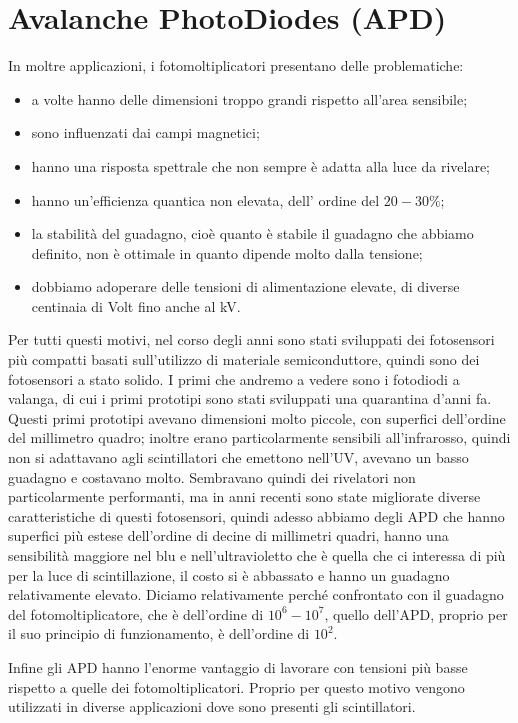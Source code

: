 \section{Avalanche PhotoDiodes (APD)}
In moltre applicazioni, i fotomoltiplicatori presentano delle problematiche:
\begin{itemize}
   \item a volte hanno delle dimensioni troppo grandi rispetto all'area sensibile;
   \item sono influenzati dai campi magnetici;
   \item hanno una risposta spettrale che non sempre è adatta alla luce da rivelare;
   \item hanno un'efficienza quantica non elevata, dell' ordine del $20-30\%$;
   \item la stabilità del guadagno, cioè quanto è stabile il guadagno che abbiamo definito, non è ottimale in quanto dipende molto dalla tensione;
   \item dobbiamo adoperare delle tensioni di alimentazione elevate, di diverse centinaia di Volt fino anche al kV.
\end{itemize}
Per tutti questi motivi, nel corso degli anni sono stati sviluppati dei fotosensori più compatti basati sull'utilizzo di materiale semiconduttore, quindi sono dei fotosensori a stato solido. I primi che andremo a vedere sono i fotodiodi a valanga, di cui i primi prototipi sono stati sviluppati una quarantina d'anni fa. Questi primi prototipi avevano dimensioni molto piccole, con superfici dell'ordine del millimetro quadro; inoltre erano particolarmente sensibili all'infrarosso, quindi non si adattavano agli scintillatori che emettono nell'UV, avevano un basso guadagno e costavano molto. Sembravano quindi dei rivelatori non particolarmente performanti, ma in anni recenti sono state migliorate diverse caratteristiche di questi fotosensori, quindi adesso abbiamo degli APD che hanno superfici più estese dell'ordine di decine di millimetri quadri, hanno una sensibilità maggiore nel blu e nell'ultravioletto che è quella che ci interessa di più per la luce di scintillazione, il costo si è abbassato e hanno un guadagno relativamente elevato. Diciamo relativamente perché confrontato con il guadagno del fotomoltiplicatore, che è dell'ordine di $10^6-10^7$, quello dell'APD, proprio per il suo principio di funzionamento, è dell'ordine di $10^2$.

Infine gli APD hanno l'enorme vantaggio di lavorare con tensioni più basse rispetto a quelle dei fotomoltiplicatori. Proprio per questo motivo vengono utilizzati in diverse applicazioni dove sono presenti gli scintillatori.


